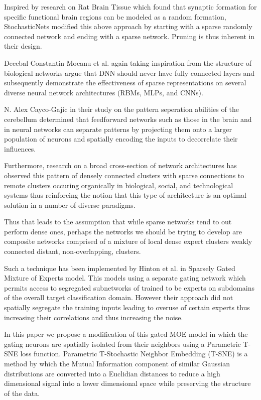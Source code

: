 \documentclass{llncs}
\begin{document}
Inspired by research on Rat Brain Tissue which found that synaptic formation for specific functional brain regions can be modeled as a random formation, StochasticNets modified this above approach by starting with a sparse randomly connected network and ending with a sparse network. Pruning is thus inherent in their design.

Decebal Constantin Mocanu et al. again taking inspiration from the structure of biological networks argue that DNN should never have fully connected layers and subsequently demonstrate the effectiveness of sparse representations on several diverse neural network architectures (RBMs, MLPs, and CNNs).

N. Alex Cayco-Gajic in their study on the pattern seperation abilities of the cerebellum determined that feedforward networks such as those in the brain and in neural networks can separate patterns by projecting them onto a larger population of neurons and spatially encoding the inputs to decorrelate their influences.

Furthermore, research on a broad cross-section of network architectures has observed this pattern of densely connected clusters with sparse connections to remote clusters occuring organically in biological, social, and technological systems thus reinforcing the notion that this type of architecture is an optimal solution in a number of diverse paradigms.

Thus that leads to the assumption that while sparse networks tend to out perform dense ones, perhaps the networks we should be trying to develop are composite networks comprised of a mixture of local dense expert clusters weakly connected distant, non-overlapping, clusters.

Such a technique has been implemented by Hinton et al. in Sparsely Gated Mixture of Experts model.  This models using a separate gating network which permits access to segregated subnetworks of trained to be experts on subdomains of the overall target classification domain.  However their approach did not spatially segregate the training inputs leading to overuse of certain experts thus increasing their correlations and thus increasing the noise.

In this paper we propose a modification of this gated MOE model in which the gating neurons are spatially isolated from their neighbors
using a Parametric T-SNE loss function. Parametric T-Stochastic Neighbor Embedding (T-SNE) is a method by which the Mutual Information component of similar Gaussian distributions are converted into a Euclidian distances to reduce a high dimensional signal into a lower dimensional space while preserving the structure of the data.
\end{document}
